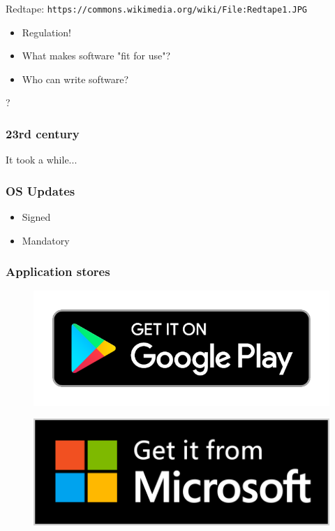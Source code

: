 Redtape: \verb|https://commons.wikimedia.org/wiki/File:Redtape1.JPG|

\begin{itemize}
\item Regulation!
\item What makes software "fit for use"?
\item Who can write software?
\end{itemize}?

\begin{frame}[fragile]
\frametitle{23rd century}

It took a while...

\end{frame}

\begin{frame}[fragile]
\frametitle{OS Updates}

\begin{itemize}
\item Signed
\item Mandatory
\end{itemize}

\end{frame}

\begin{frame}[fragile]
\frametitle{Application stores}


\begin{figure}
\includegraphics{google_badge}
\end{figure}
\begin{figure}
\includegraphics[scale=0.15]{microsoft_badge}
\end{figure}


\end{frame}

